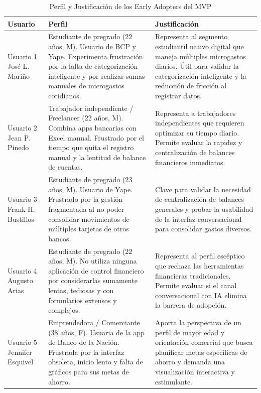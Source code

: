 \documentclass[12pt]{article}
\begin{document}
\begin{table}[H]
\centering
\singlespacing
\caption{Perfil y Justificación de los Early Adopters del MVP}
\label{tab:early_adopters}
\begin{tabular}{p{3.5cm}p{5.7cm}p{6cm}}
\toprule
\textbf{Usuario} & \textbf{Perfil} & \textbf{Justificación} \\
\midrule
Usuario 1 \newline José L. Mariño & Estudiante de pregrado (22 años, M). Usuario de BCP y Yape. Experimenta frustración por la falta de categorización inteligente y por realizar sumas manuales de microgastos cotidianos. & Representa al segmento estudiantil nativo digital que maneja múltiples microgastos diarios. Útil para validar la categorización inteligente y la reducción de fricción al registrar datos. \\
\addlinespace
Usuario 2 \newline Jean P. Pinedo & Trabajador independiente / Freelancer (22 años, M). Combina apps bancarias con Excel manual. Frustrado por el tiempo que quita el registro manual y la lentitud de balance de cuentas. & Representa a trabajadores independientes que requieren optimizar su tiempo diario. Permite evaluar la rapidez y centralización de balances financieros inmediatos. \\
\addlinespace
Usuario 3 \newline Frank H. Bustillos & Estudiante de pregrado (23 años, M). Usuario de Yape. Frustrado por la gestión fragmentada al no poder consolidar movimientos de múltiples tarjetas de otros bancos. & Clave para validar la necesidad de centralización de balances generales y probar la usabilidad de la interfaz conversacional para consolidar gastos diversos. \\
\addlinespace
Usuario 4 \newline Augusto Arias & Estudiante de pregrado (22 años, M). No utiliza ninguna aplicación de control financiero por considerarlas sumamente lentas, tediosas y con formularios extensos y complejos. & Representa al perfil escéptico que rechaza las herramientas financieras tradicionales. Permite evaluar si el canal conversacional con IA elimina la barrera de adopción. \\
\addlinespace
Usuario 5 \newline Jennifer Esquivel & Emprendedora / Comerciante (38 años, F). Usuaria de la app de Banco de la Nación. Frustrada por la interfaz obsoleta, inicio lento y falta de gráficos para sus metas de ahorro. & Aporta la perspectiva de un perfil de mayor edad y orientación comercial que busca planificar metas específicas de ahorro y demanda una visualización interactiva y estimulante. \\
\bottomrule
\end{tabular}
\end{table}
\end{document}
